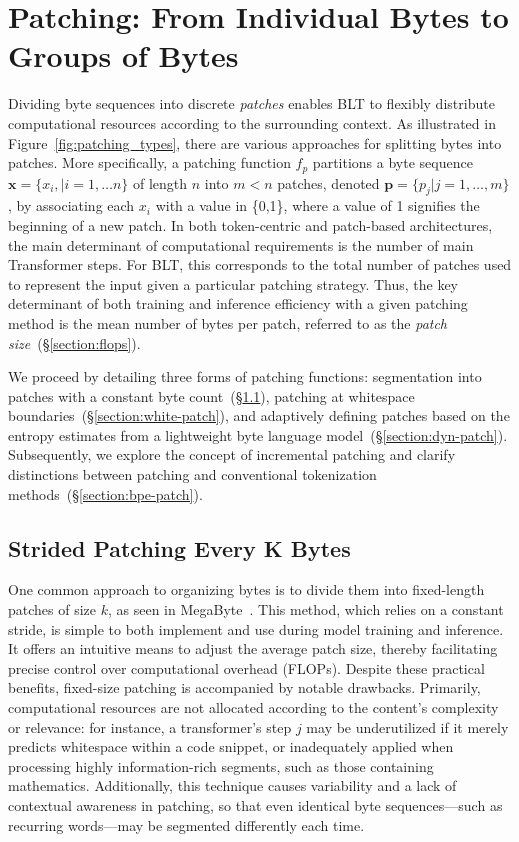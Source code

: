 \section{Patching: From Individual Bytes to Groups of Bytes}
\label{section:patching}

Dividing byte sequences into discrete \textit{patches} enables {\textsc BLT} to flexibly distribute computational resources according to the surrounding context. As illustrated in Figure~\ref{fig:patching_types}, there are various approaches for splitting bytes into patches. More specifically, a patching function $f_p$ partitions a byte sequence $\pmb{x}=\{x_i,|i=1,\ldots n\}$ of length $n$ into $m < n$ patches, denoted $\pmb{p}=\{p_j|j=1,\ldots,m\}$, by associating each $x_i$ with a value in \{0,1\}, where a value of 1 signifies the beginning of a new patch. In both token-centric and patch-based architectures, the main determinant of computational requirements is the number of main Transformer steps. For {\textsc BLT}, this corresponds to the total number of patches used to represent the input given a particular patching strategy. Thus, the key determinant of both training and inference efficiency with a given patching method is the mean number of bytes per patch, referred to as the \textit{patch size}~(\S\ref{section:flops}).

We proceed by detailing three forms of patching functions: segmentation into patches with a constant byte count~(\S\ref{section:static-patch}), patching at whitespace boundaries~(\S\ref{section:white-patch}), and adaptively defining patches based on the entropy estimates from a lightweight byte language model~(\S\ref{section:dyn-patch}). Subsequently, we explore the concept of incremental patching and clarify distinctions between patching and conventional tokenization methods~(\S\ref{section:bpe-patch}).

\subsection{Strided Patching Every K Bytes}
\label{section:static-patch}

One common approach to organizing bytes is to divide them into fixed-length patches of size $k$, as seen in MegaByte~\citep{yu2023megabyte}. This method, which relies on a constant stride, is simple to both implement and use during model training and inference. It offers an intuitive means to adjust the average patch size, thereby facilitating precise control over computational overhead (FLOPs). Despite these practical benefits, fixed-size patching is accompanied by notable drawbacks. Primarily, computational resources are not allocated according to the content's complexity or relevance: for instance, a transformer's step $j$ may be underutilized if it merely predicts whitespace within a code snippet, or inadequately applied when processing highly information-rich segments, such as those containing mathematics. Additionally, this technique causes variability and a lack of contextual awareness in patching, so that even identical byte sequences—such as recurring words—may be segmented differently each time.

